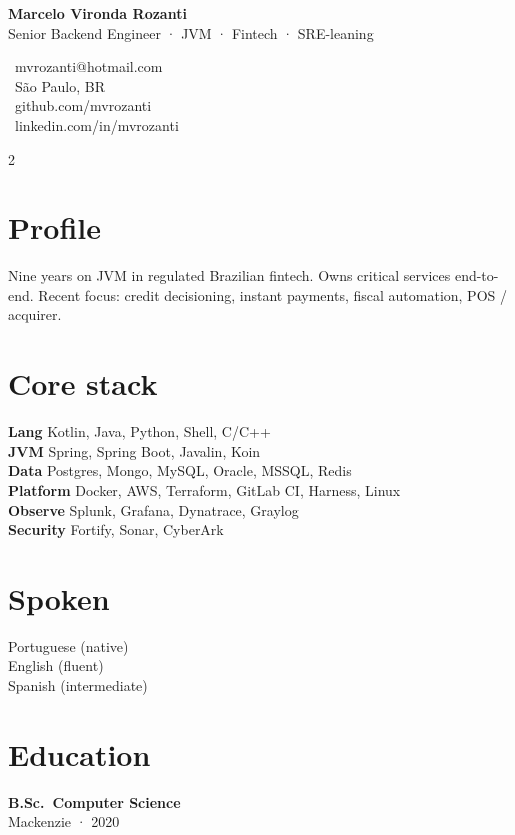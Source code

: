 \documentclass[10pt,a4paper]{article}
\begin{document}
\noindent
\begin{minipage}{0.7\linewidth}
{\Huge\bfseries Marcelo Vironda Rozanti}\\[2pt]
{\large\color{accent}Senior Backend Engineer · JVM · Fintech · SRE-leaning}
\end{minipage}\hfill
\begin{minipage}{0.28\linewidth}
\footnotesize\raggedleft
\faEnvelope\ mvrozanti@hotmail.com\\
\faMapMarker*\ São Paulo, BR\\
\faGithub\ github.com/mvrozanti\\
\faLinkedin\ linkedin.com/in/mvrozanti
\end{minipage}
\vspace{6pt}

\begin{paracol}{2}

\section{Profile}
\footnotesize Nine years on JVM in regulated Brazilian fintech. Owns critical services end-to-end. Recent focus: credit decisioning, instant payments, fiscal automation, POS / acquirer.

\section{Core stack}
\footnotesize
\textbf{Lang} Kotlin, Java, Python, Shell, C/C++\\
\textbf{JVM} Spring, Spring Boot, Javalin, Koin\\
\textbf{Data} Postgres, Mongo, MySQL, Oracle, MSSQL, Redis\\
\textbf{Platform} Docker, AWS, Terraform, GitLab CI, Harness, Linux\\
\textbf{Observe} Splunk, Grafana, Dynatrace, Graylog\\
\textbf{Security} Fortify, Sonar, CyberArk

\section{Spoken}
\footnotesize Portuguese (native)\\English (fluent)\\Spanish (intermediate)

\section{Education}
\footnotesize\textbf{B.Sc.\ Computer Science}\\Mackenzie · 2020


\end{paracol}
\end{document}

